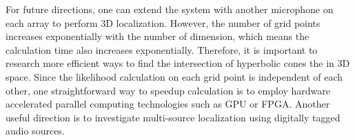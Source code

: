 For future directions, one can extend the system with another microphone on each array to perform 3D localization. However, the number of grid points increases exponentially with the number of dimension, which means the calculation time also increases exponentially. Therefore, it is important to research more efficient ways to find the intersection of hyperbolic cones the in 3D space.  Since the likelihood calculation on each grid point is independent of each other, one straightforward way to speedup calculation is to employ hardware accelerated parallel computing technologies such as GPU or FPGA. Another useful direction is to investigate multi-source localization using digitally tagged audio sources.  


